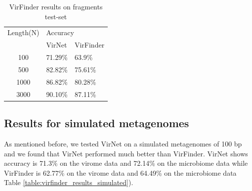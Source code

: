 \documentclass[conference]{IEEEtran}
\begin{document}

\begin{table}[!htbp]
	\centering
	\begin{tabular}{||c l l ||} 
		Length(N) &	\multicolumn{2}{l}{Accuracy} \\ [0.5ex] 
		& VirNet & VirFinder\\
		\hline\hline
		100 & 71.29\% &	63.9\%	 \\
		500 & 82.82\% &	75.61\% \\
		1000 & 86.82\% &	80.28\%  \\
		3000 & 90.10\% &	87.11\%  \\[1ex]
	\end{tabular}
	\caption{VirFinder results on fragments test-set}
	\label{table:virfinder_results}
\end{table}

\subsection{Results for simulated metagenomes}

As mentioned before, we tested VirNet on a simulated metagenomes of 100 bp and we found that VirNet performed much better than VirFinder. VirNet shows accuracy is 71.3\% on the virome data and 72.14\% on the microbiome data while VirFinder is 62.77\% on the virome data and 64.49\% on the microbiome data Table \ref{table:virfinder_results_simulated}). %
\end{document}
